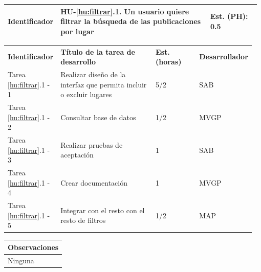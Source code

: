 \documentclass[11pt]{article}
\begin{document}
\begin{longtable}{p{0.18\linewidth}|p{0.6\linewidth}|p{0.2\linewidth}}
  \rowcolor{LightCyan}
  \textbf{Identificador} & \textbf{HU-\ref{hu:filtrar}.1}.  Un usuario quiere filtrar la búsqueda de las publicaciones por lugar & \textbf{Est. (PH):} 0.5 \\
  \bottomrule
\end{longtable}
\vspace{-0.5cm}
\begin{longtable}{p{0.18\linewidth}|p{0.4\linewidth}|p{0.18\linewidth}|p{0.2\linewidth}}
  \toprule
  \textbf{Identificador} & \textbf{Título de la tarea de desarrollo} & \textbf{Est. (horas)} & \textbf{Desarrollador} \\
  Tarea \ref{hu:filtrar}.1 - 1 & Realizar diseño de la interfaz que permita incluir o excluir lugares & 5/2 & SAB\\
  Tarea \ref{hu:filtrar}.1 - 2 & Consultar base de datos & 1/2 & MVGP\\
  Tarea \ref{hu:filtrar}.1 - 3 & Realizar pruebas de aceptación & 1 & SAB\\
  Tarea \ref{hu:filtrar}.1 - 4 & Crear documentación & 1 & MVGP\\
  Tarea \ref{hu:filtrar}.1 - 5 & Integrar con el resto con el resto de filtros & 1/2 & MAP\\
  \bottomrule
\end{longtable}
\vspace{-0.5cm}
\begin{longtable}{p{1.028\linewidth}}
  \textbf{Observaciones}\\
  \midrule
  Ninguna\\
  \bottomrule
\end{longtable}
\end{document}
